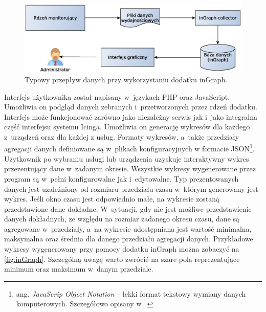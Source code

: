 \begin{figure}[h]
  \caption{Typowy przepływ danych przy wykorzystaniu dodatku inGraph.}
  \label{fig:inGraphFlow}
\includegraphics[width=1\textwidth]{img/ingraphFlow}
\end{figure}

Interfejs użytkownika został napisany w~językach PHP oraz
JavaScript. Umożliwia on podgląd danych zebranych i~przetworzonych
przez rdzeń dodatku. Interfejs może funkcjonować zarówno jako
niezależny serwis jak i~jako integralna część interfejsu systemu
Icinga. Umożliwia on generację wykresów dla każdego z~urządzeń oraz
dla każdej z usług. Formaty wykresów, a~także przedziały agregacji
danych definiowane są w~plikach konfiguracyjnych w formacie
JSON\footnote{ang. {\em JavaScrip Object Notation} -- lekki format
  tekstowy wymiany danych komputerowych. Szczegółowo opisany w~\cite{www:JSON}.}.
Użytkownik po wybraniu usługi lub urządzenia uzyskuje interaktywny
wykres przezentujący dane w~zadanym okresie. Wszystkie wykresy
wygenerowane przez program są w~pełni konfigurowalne jak
i~edytowalne. Typ prezentowanych danych jest uzależniony od rozmiaru
przedziału czasu w~którym generowany jest wykres. Jeśli okno czasu
jest odpowiednio małe, na wykresie zostaną przedstawione dane
dokładne. W~sytuacji, gdy nie jest możliwe przedstawienie danych
dokładnych, ze względu na rozmiar zadanego okresu czasu, dane są
agregowane w~przedziały, a~na wykresie udostępniana jest wartość
minimalna, maksymalna oraz średnia dla danego przedziału agregacji
danych. Przykładowe wykresy wygenerowany przy pomocy dodatku inGraph
można zobaczyć na \ref{fig:inGraph}. Szczególną uwagę warto zwrócić na
szare pola reprezentujące minimum oraz maksimum w~danym przedziale.

